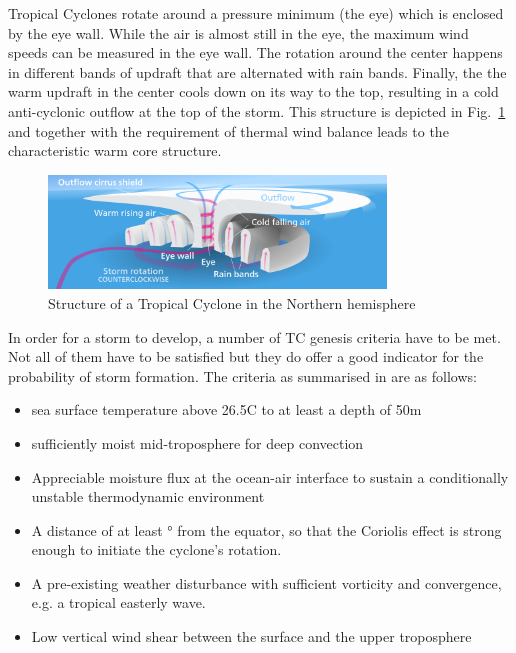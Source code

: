 Tropical Cyclones rotate around a pressure minimum (the eye) which is enclosed by the eye wall. While the air is almost still in the eye, the maximum wind speeds can be measured in the eye wall. The rotation around the center happens in different bands of updraft that are alternated with rain bands. Finally, the the warm updraft in the center cools down on its way to the top, resulting in a cold anti-cyclonic outflow at the top of the storm. This structure is depicted in Fig.~\ref{fig:tc-structure} and together with the requirement of thermal wind balance leads to the characteristic warm core structure.
\begin{figure}[ht]
	\centering
	\includegraphics[width=0.8\textwidth]{img/hurricane-structure.png}
	\caption{Structure of a Tropical Cyclone in the Northern hemisphere~\cite{hurricane-structure}}
	\label{fig:tc-structure}
\end{figure}
In order for a storm to develop, a number of TC genesis criteria have to be met. Not all of them have to be satisfied but they do offer a good indicator for the probability of storm formation.
The criteria as summarised in \cite{lohmann-storms} are as follows:
\begin{itemize}
	\item sea surface temperature above 26.5\degree C to at least a depth of 50m
	\item sufficiently moist mid-troposphere for deep convection
	\item Appreciable moisture flux at the ocean-air interface to sustain a conditionally unstable thermodynamic environment \cite{moisture-flux}
	\item A distance of at least \unit[5]{\degree} from the equator, so that the Coriolis effect is strong enough to initiate the cyclone's rotation. \cite{coriolis}
	\item A pre-existing weather disturbance with sufficient vorticity and convergence, e.g. a tropical easterly wave.
	\item Low vertical wind shear between the surface and the upper troposphere
\end{itemize}


